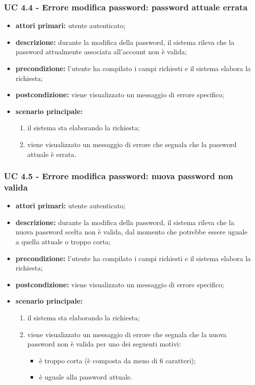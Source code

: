 			\subsubsection{UC 4.4 - Errore modifica password: password attuale errata}
			\begin{itemize}
				\item \textbf{attori primari:} utente autenticato;
				\item \textbf{descrizione:} durante la modifica della password, il sistema rileva che la password attualmente associata all'account non è valida;
				\item \textbf{precondizione:} l'utente ha compilato i campi richiesti e il sistema elabora la richiesta;
				\item \textbf{postcondizione:} viene visualizzato un messaggio di errore specifico;
				\item \textbf{scenario principale:}
				\begin{enumerate}
					\item il sistema sta elaborando la richiesta;
					\item viene visualizzato un messaggio di errore che segnala che la password attuale è errata.
				\end{enumerate}
			\end{itemize}

			\subsubsection{UC 4.5 - Errore modifica password: nuova password non valida}
			\begin{itemize}
				\item \textbf{attori primari:} utente autenticato;
				\item \textbf{descrizione:} durante la modifica della password, il sistema rileva che la nuova password scelta non è valida, dal momento che potrebbe essere uguale a quella attuale o troppo corta;
				\item \textbf{precondizione:} l'utente ha compilato i campi richiesti e il sistema elabora la richiesta;
				\item \textbf{postcondizione:} viene visualizzato un messaggio di errore specifico;
				\item \textbf{scenario principale:}
				\begin{enumerate}
					\item il sistema sta elaborando la richiesta;
					\item viene visualizzato un messaggio di errore che segnala che la nuova password non è valida per uno dei seguenti motivi:
					\begin{itemize}
						\item è troppo corta (è composta da meno di 6 caratteri);
						\item è uguale alla password attuale.
					\end{itemize}
				\end{enumerate}
			\end{itemize}

